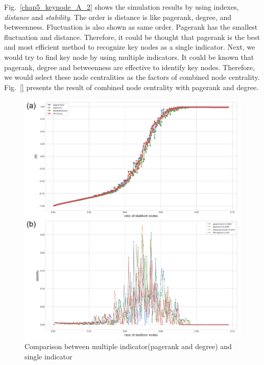 Fig.~\ref{chap5_keynode_A_2} shows the simulation results by using indexes, \textit{distance} and \textit{stability}. The order is distance is like pagerank, degree, and betweenness. Fluctuation is also shown as same order. Pagerank has the smallest fluctuation and distance. Therefore, it could be thought that pagerank is the best and most efficient method to recognize key nodes as a single indicator.  
Next, we would try to find key node by using multiple indicators. It could be known that pagerank, degree and betweenness are effective to identify key nodes. Therefore, we would select these node centralities as the factors of combined node centrality.
Fig.~\ref{} presents the result of combined node centrality with pagerank and degree. 
\begin{figure}[!htb]
	\centering
	\includegraphics[width=\hsize]{figure/chap5_keynode_A_3.png}
	\caption{Comparison between multiple indicator(pagerank and degree) and single indicator}
	\label{chap5_keynode_A_3}
\end{figure}



  
 


 
    

